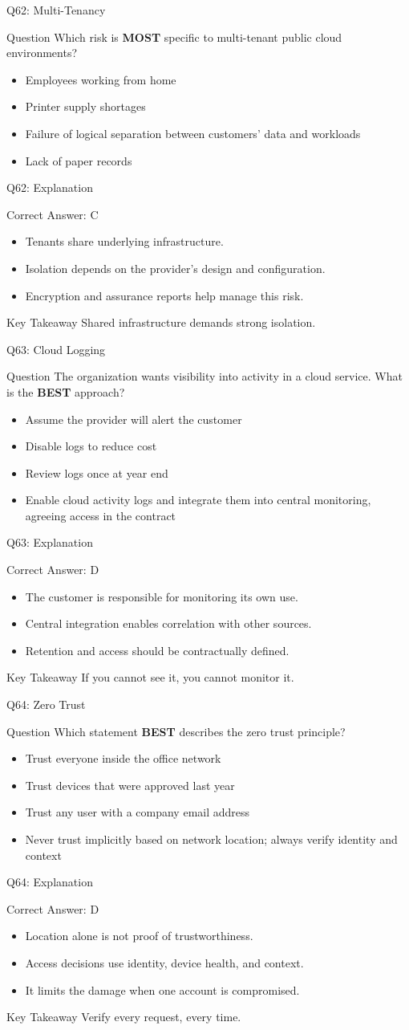 \documentclass[aspectratio=169]{beamer}
\newcommand{\hq}[7]{%
	\begin{frame}{Q#1: #2}
		\begin{block}{Question}
			#3
		\end{block}
		\begin{itemize}
			#4
		\end{itemize}
	\end{frame}
	\begin{frame}{Q#1: Explanation}
		\begin{block}{Correct Answer: #5}
			\begin{itemize}
				#6
			\end{itemize}
		\end{block}
		\begin{alertblock}{Key Takeaway}
			#7
		\end{alertblock}
	\end{frame}
}
\begin{document}
	\hq{62}{Multi-Tenancy}
	{Which risk is \textbf{MOST} specific to multi-tenant public cloud environments?}
	{\item[\textbf{(A)}] Employees working from home
		\item[\textbf{(B)}] Printer supply shortages
		\item[\textbf{(C)}] Failure of logical separation between customers' data and workloads
		\item[\textbf{(D)}] Lack of paper records}
	{C}
	{\item Tenants share underlying infrastructure.
		\item Isolation depends on the provider's design and configuration.
		\item Encryption and assurance reports help manage this risk.}
	{Shared infrastructure demands strong isolation.}
	
	\hq{63}{Cloud Logging}
	{The organization wants visibility into activity in a cloud service. What is the \textbf{BEST} approach?}
	{\item[\textbf{(A)}] Assume the provider will alert the customer
		\item[\textbf{(B)}] Disable logs to reduce cost
		\item[\textbf{(C)}] Review logs once at year end
		\item[\textbf{(D)}] Enable cloud activity logs and integrate them into central monitoring, agreeing access in the contract}
	{D}
	{\item The customer is responsible for monitoring its own use.
		\item Central integration enables correlation with other sources.
		\item Retention and access should be contractually defined.}
	{If you cannot see it, you cannot monitor it.}
	
	\hq{64}{Zero Trust}
	{Which statement \textbf{BEST} describes the zero trust principle?}
	{\item[\textbf{(A)}] Trust everyone inside the office network
		\item[\textbf{(B)}] Trust devices that were approved last year
		\item[\textbf{(C)}] Trust any user with a company email address
		\item[\textbf{(D)}] Never trust implicitly based on network location; always verify identity and context}
	{D}
	{\item Location alone is not proof of trustworthiness.
		\item Access decisions use identity, device health, and context.
		\item It limits the damage when one account is compromised.}
	{Verify every request, every time.}
	
\end{document}
